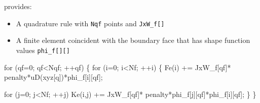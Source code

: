 \begin{frame}[fragile]
  \begin{block}{}
  \texttt{\libMesh{}} provides:
  \begin{itemize}
  \item {A quadrature rule with \texttt{Nqf} points and \texttt{JxW\_f[]}}
  \item {A finite element coincident with the boundary face that has %
    shape function values \texttt{phi\_f[][]}}
  \end{itemize}
  \end{block}
\small
  \begin{semiverbatim}
for (qf=0; qf<Nqf; ++qf) \{
  for (i=0; i<Nf; ++i) \{
    Fe(i) += JxW_f[qf]*
      \alert<2>{penalty}*\alert<3>{uD(xyz[q])}*phi_f[i][qf];
	
    for (j=0; j<Nf; ++j)
      Ke(i,j) += JxW_f[qf]*
        \alert<2>{penalty}*phi_f[j][qf]*phi_f[i][qf];
  \}
\}
    \end{semiverbatim}

\end{frame}
